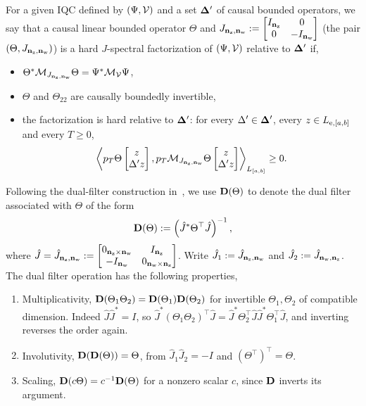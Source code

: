 \begin{definition} 
\label{def:dynamic-filters}\label{def:factorization}
For a given IQC defined by $(\Psi,{\mathcal{V}})$ and a set $\mathbf{\Delta}'$ of
causal bounded operators, we say that a causal linear bounded operator
$\Theta$ and $J_{\mathbf{n}_{{\mathrm{z}}},\mathbf{n}_{{\mathrm{w}}}}:=\begin{bmatrix}I_{\mathbf{n}_{{\mathrm{z}}}}&0\\0&-I_{\mathbf{n}_{{\mathrm{w}}}}\end{bmatrix}$
(the pair $(\Theta,J_{\mathbf{n}_{{\mathrm{z}}},\mathbf{n}_{{\mathrm{w}}}})$) is a hard
$J$-spectral factorization of $(\Psi,{\mathcal{V}})$ relative to $\mathbf{\Delta}'$ if,
\begin{itemize}
\item $\Theta^*\mathcal{M}_{J_{\mathbf{n}_{{\mathrm{z}}},\mathbf{n}_{{\mathrm{w}}}}}\Theta
=\Psi^*\mathcal{M}_{\mathcal{V}}\Psi$,
\item $\Theta$ and $\Theta_{22}$ are causally boundedly invertible,
\item the factorization is hard relative to $\mathbf{\Delta}'$: for every
$\Delta'\in\mathbf{\Delta}'$, every $z\in L_{{\mathrm{e}},[a,b]}$ and every $T\geq0$,
\[
\left\langle p_T\Theta\begin{bmatrix}z\\\Delta'z\end{bmatrix}, p_T\mathcal{M}_{J_{\mathbf{n}_{{\mathrm{z}}},\mathbf{n}_{{\mathrm{w}}}}}\Theta\begin{bmatrix}z\\\Delta'z\end{bmatrix} \right\rangle_{L_{[a,b]}}
\geq0.
\]
\end{itemize}
Following the
dual-filter construction in~\cite{venkataraman}, we use $\mathbf{D}(\Theta)$ to 
denote the dual filter associated with $\Theta$ of the form
\begin{equation*}
\mathbf{D}(\Theta)
:=
\left(\hat{J}^*\Theta^\top\hat{J}\right)^{-1},
\end{equation*}
where $\hat{J}=\hat{J}_{\mathbf{n}_{{\mathrm{z}}},\mathbf{n}_{{\mathrm{w}}}}:=\begin{bmatrix}0_{\mathbf{n}_{{\mathrm{z}}}\times\mathbf{n}_{{\mathrm{w}}}}&I_{\mathbf{n}_{{\mathrm{z}}}}\\-I_{\mathbf{n}_{{\mathrm{w}}}}&0_{\mathbf{n}_{{\mathrm{w}}}\times\mathbf{n}_{{\mathrm{z}}}}\end{bmatrix}$.
Write $\hat J_1:=\hat J_{\mathbf{n}_{{\mathrm{z}}},\mathbf{n}_{{\mathrm{w}}}}$ and
$\hat J_2:=\hat J_{\mathbf{n}_{{\mathrm{w}}},\mathbf{n}_{{\mathrm{z}}}}$. The dual filter
operation has the following properties,
\begin{enumerate}
\item Multiplicativity, $\mathbf{D}(\Theta_1\Theta_2)=\mathbf{D}(\Theta_1)\mathbf{D}(\Theta_2)$
for invertible $\Theta_1,\Theta_2$ of compatible dimension. Indeed
$\hat J\hat J^*=I$, so
$\hat J^*(\Theta_1\Theta_2)^\top\hat J
=\hat J^*\Theta_2^\top\hat J\hat J^*\Theta_1^\top\hat J$,
and inverting reverses the order again.
\item Involutivity, $\mathbf{D}(\mathbf{D}(\Theta))=\Theta$, from
$\hat J_1\hat J_2=-I$ and $(\Theta^\top)^\top=\Theta$.
\item Scaling, $\mathbf{D}(c\Theta)=c^{-1}\mathbf{D}(\Theta)$ for a nonzero scalar
$c$, since $\mathbf{D}$ inverts its argument.
\end{enumerate}
\end{definition}

